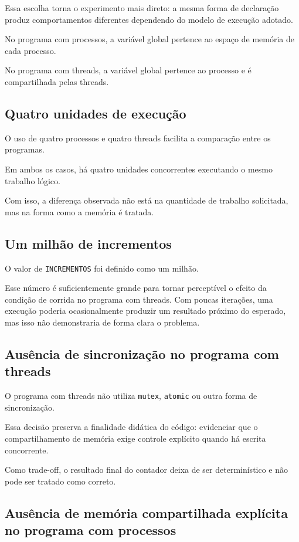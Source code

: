 Essa escolha torna o experimento mais direto: a mesma forma de declaração produz comportamentos diferentes dependendo do modelo de execução adotado.

No programa com processos, a variável global pertence ao espaço de memória de cada processo.

No programa com threads, a variável global pertence ao processo e é compartilhada pelas threads.

\subsection{Quatro unidades de execução}

O uso de quatro processos e quatro threads facilita a comparação entre os programas.

Em ambos os casos, há quatro unidades concorrentes executando o mesmo trabalho lógico.

Com isso, a diferença observada não está na quantidade de trabalho solicitada, mas na forma como a memória é tratada.

\subsection{Um milhão de incrementos}

O valor de \texttt{INCREMENTOS} foi definido como um milhão.

Esse número é suficientemente grande para tornar perceptível o efeito da condição de corrida no programa com threads. Com poucas iterações, uma execução poderia ocasionalmente produzir um resultado próximo do esperado, mas isso não demonstraria de forma clara o problema.

\subsection{Ausência de sincronização no programa com threads}

O programa com threads não utiliza \texttt{mutex}, \texttt{atomic} ou outra forma de sincronização.

Essa decisão preserva a finalidade didática do código: evidenciar que o compartilhamento de memória exige controle explícito quando há escrita concorrente.

Como trade-off, o resultado final do contador deixa de ser determinístico e não pode ser tratado como correto.

\subsection{Ausência de memória compartilhada explícita no programa com processos}

